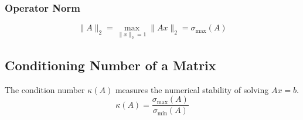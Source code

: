 \subsubsection{Operator Norm}
\begin{definition}
    \begin{equation*}
        \|A\|_2 = \max_{\|x\|_2 = 1} \|Ax\|_2 = \sigma_{\max}(A)
        \end{equation*}
\end{definition}

\subsection{Conditioning Number of a Matrix}
\begin{definition}
    The condition number \( \kappa(A) \) measures the numerical stability of solving \( A x = b \). 
    \begin{equation*}
        \kappa(A) = \frac{\sigma_{\max}(A)}{\sigma_{\min}(A)}
        \end{equation*}
\end{definition}

